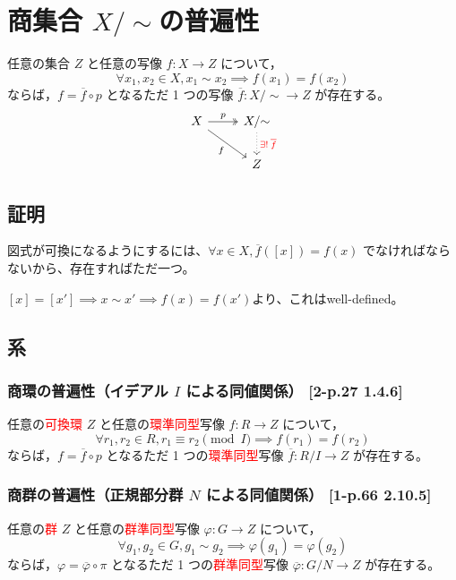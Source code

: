 \documentclass[twocolumn]{jsarticle}
\renewcommand{\phi}{\varphi}
\begin{document}
\section{商集合 \(X/{\sim}\)の普遍性}
\begin{screen}
任意の集合 \(Z\) と任意の写像 \(f\colon X \to Z\) について，
\[\forall x_1, x_2 \in X, x_1 \sim x_2 \implies f(x_1) = f(x_2)\]
ならば，\(f = \overline{f} \circ p\) となるただ 1 つの写像 \(\overline{f} \colon X/{\sim} \to Z\) が存在する。
\[
\begin{tikzcd}
  X \ar[r, "p", two heads] \ar[rd, "f"'] & X/{\sim} \ar[d, "\textcolor{red}{\exists! \: \overline{f}}", dotted] \\
  & Z
\end{tikzcd}
\]
\end{screen}

\subsection{証明}
図式が可換になるようにするには、\(\forall x\in X, \overline{f}([x]) = f(x)\) でなければならないから、存在すればただ一つ。

\([x]=[x'] \implies x\sim x' \implies f(x)=f(x')\)より、これはwell-defined。

\subsection{系}
\subsubsection{商環の普遍性（イデアル \(I\) による同値関係） [2-p.27 1.4.6]}
任意の\textcolor{red}{可換環} \(Z\) と任意の\textcolor{red}{環準同型}写像 \(f \colon R \to Z\) について，
\[\forall r_1, r_2 \in R, r_1 \equiv r_2\pmod I \implies f(r_1) = f(r_2)\]
ならば，\(f = \overline{f} \circ p\) となるただ 1 つの\textcolor{red}{環準同型}写像 \(\overline{f} \colon R/I \to Z\) が存在する。
\subsubsection{商群の普遍性（正規部分群 \(N\) による同値関係） [1-p.66 2.10.5]}
任意の\textcolor{red}{群} \(Z\) と任意の\textcolor{red}{群準同型}写像 \(\phi \colon G \to Z\) について，
\[\forall g_1, g_2 \in G, g_1 \sim g_2 \implies \phi(g_1) = \phi(g_2)\]
ならば，\(\phi = \overline{\phi} \circ \pi\) となるただ 1 つの\textcolor{red}{群準同型}写像 \(\overline{\phi} \colon G/N \to Z\) が存在する。
\end{document}
